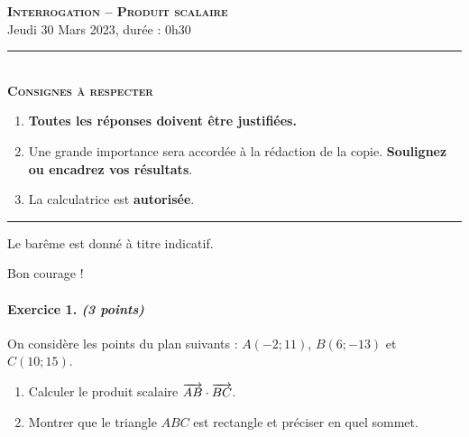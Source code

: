 \documentclass[11pt]{article}
\begin{document}

\begin{center}
\textbf{\LARGE \textsc{Interrogation -- Produit scalaire}}\\[2mm]

{\large Jeudi 30 Mars 2023, durée : 0h30}\\[1mm]
\noindent\rule{8cm}{0.4pt}\\[1mm]
\textbf{\textsc{Consignes à respecter}}
\begin{enumerate}[label=\textbf{\arabic*/}]
\item \textbf{Toutes les réponses doivent être justifiées.}
\item Une grande importance sera accordée à la rédaction de la
  copie. \textbf{Soulignez ou encadrez vos résultats}.
\item La calculatrice est \textbf{autorisée}.
    \end{enumerate}
\noindent\rule{12cm}{0.4pt}
\end{center}

\vspace{2mm}
\noindent Le barême est donné à titre indicatif.
\vspace{2mm}
\begin{center}
  Bon courage !
\end{center}

\paragraph{Exercice 1. \emph{(3 points)}}
On considère les points du plan suivants : $A(-2; 11)$, $B(6; -13)$ et
$C(10; 15)$.
\begin{enumerate}
  \item Calculer le produit scalaire $\overrightarrow{AB}\cdot\overrightarrow{BC}$.
  \item Montrer que le triangle $ABC$ est rectangle et préciser en quel sommet.
\end{enumerate}
\end{document}
